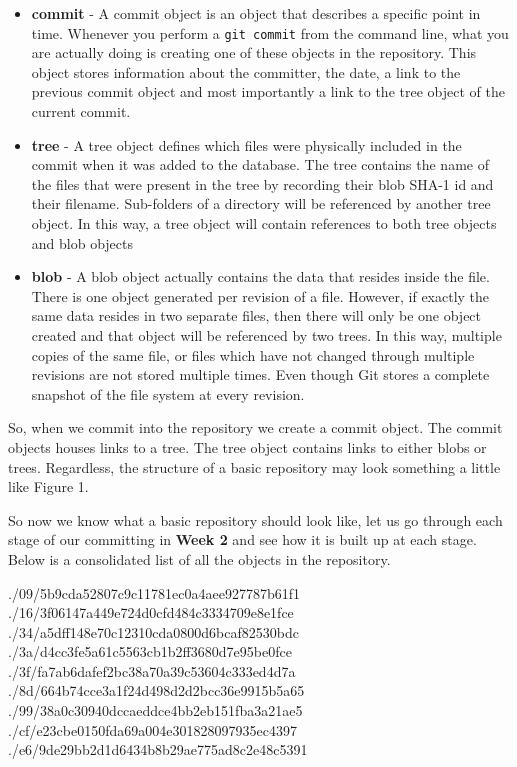 \begin{itemize}
\item\textbf{commit} - A commit object is an object that describes a specific point in time.
Whenever you perform a \texttt{git commit} from the command line, what you are actually doing is creating one of these objects in the repository.
This object stores information about the committer, the date, a link to the previous commit object and most importantly a link to the tree object of the current commit.
\item\textbf{tree} - A tree object defines which files were physically included in the commit when it was added to the database.
The tree contains the name of the files that were present in the tree by recording their blob SHA-1 id and their filename.
Sub-folders of a directory will be referenced by another tree object.
In this way, a tree object will contain references to both tree objects and blob objects
\item\textbf{blob} - A blob object actually contains the data that resides inside the file.
There is one object generated per revision of a file.
However, if exactly the same data resides in two separate files, then there will only be one object created and that object will be referenced by two trees.
In this way, multiple copies of the same file, or files which have not changed through multiple revisions are not stored multiple times.
Even though Git stores a complete snapshot of the file system at every revision.
\end{itemize}

So, when we commit into the repository we create a commit object.
The commit objects houses links to a tree.
The tree object contains links to either blobs or trees.
Regardless, the structure of a basic repository may look something a little like Figure 1.


So now we know what a basic repository should look like, let us go through each stage of our committing in \textbf{Week 2} and see how it is built up at each stage.
Below is a consolidated list of all the objects in the repository.

\begin{code}
./09/5b9cda52807c9c11781ec0a4aee927787b61f1
./16/3f06147a449e724d0cfd484c3334709e8e1fce
./34/a5dff148e70c12310cda0800d6bcaf82530bdc
./3a/d4cc3fe5a61c5563cb1b2ff3680d7e95be0fce
./3f/fa7ab6dafef2bc38a70a39c53604c333ed4d7a
./8d/664b74cce3a1f24d498d2d2bcc36e9915b5a65
./99/38a0c30940dccaeddce4bb2eb151fba3a21ae5
./cf/e23cbe0150fda69a004e301828097935ec4397
./e6/9de29bb2d1d6434b8b29ae775ad8c2e48c5391
\end{code}

